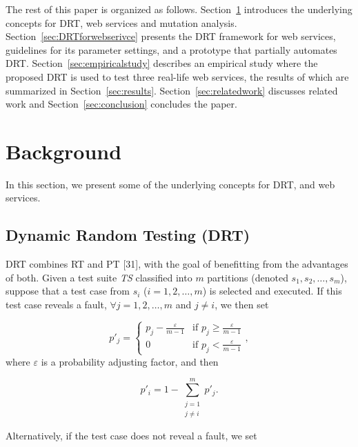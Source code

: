 \documentclass[10pt,journal,compsoc]{IEEEtran}
\begin{document}
The rest of this paper is organized as follows.
Section~\ref{sec:background} introduces the underlying concepts for DRT, web services and mutation analysis.
Section~\ref{sec:DRTforwebserivce} presents the DRT framework for web services, guidelines for its parameter settings, and a prototype that partially automates DRT.
Section~\ref{sec:empiricalstudy} describes an empirical study where the proposed DRT is used to test three real-life web services, the results of which are summarized in Section~\ref{sec:results}.
Section~\ref{sec:relatedwork} discusses related work and Section~\ref{sec:conclusion} concludes the paper.

\section{Background}
\label{sec:background}

In this section, we present some of the underlying concepts for DRT, and web services.

\subsection{Dynamic Random Testing (DRT)}
\label{sec:DRTStrategy}

DRT combines RT and PT [31], with the goal of benefitting from the advantages of both.
Given a test suite \emph{TS} classified into $m$ partitions (denoted $s_1, s_2, \ldots, s_m$),  suppose that a test case from $s_i$ ($i = 1, 2, \ldots, m$) is selected and executed.
If this test case reveals a fault, $\forall j = 1, 2, \ldots, m$ and $j \neq i$, we then set

\begin{equation}
\label{eq:DRThitJ}
p'_j =
\begin{cases}
p_j - \displaystyle\frac{\varepsilon}{m-1} & \text{if } p_j \geq \displaystyle\frac{\varepsilon}{m-1} \\
0 & \text{if } p_j < \displaystyle\frac{\varepsilon}{m-1}
\end{cases},
\end{equation}
where $\varepsilon$ is a probability adjusting factor, and then

\begin{equation}
\label{eq:DRThitI}
  p'_i = 1 - \sum_{\substack{j = 1 \\ j \neq i}}^m p'_j.
\end{equation}

Alternatively, if the test case does not reveal a fault, we set
\end{document}

